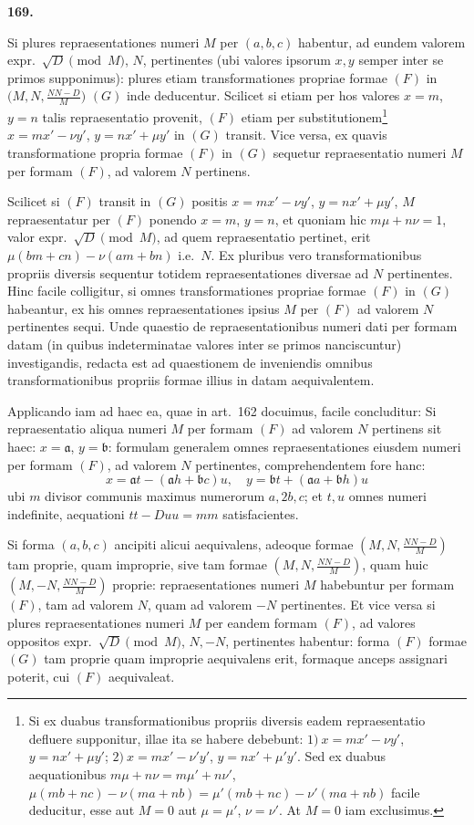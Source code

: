 \documentclass[12pt,a4paper]{article}
\theoremstyle{plain}
\theoremstyle{definition}
\theoremstyle{remark}
\begin{document}
\textbf{169.}

Si plures repraesentationes numeri $M$ per $(a,b,c)$ habentur, ad eundem valorem expr.\ $\sqrt{D}\pmod{M}$, $N$, pertinentes (ubi valores ipsorum $x,y$ semper inter se primos supponimus): plures etiam transformationes propriae formae $(F)$ in $\bigl(M,N,\frac{NN-D}{M}\bigr)$ $(G)$ inde deducentur. Scilicet si etiam per hos valores $x=m$, $y=n$ talis repraesentatio provenit, $(F)$ etiam per substitutionem\footnote{Si ex duabus transformationibus propriis diversis eadem repraesentatio defluere supponitur, illae ita se habere debebunt: $1)\ x=mx'-\nu y'$, $y=nx'+\mu y'$; $2)\ x=mx'-\nu' y'$, $y=nx'+\mu' y'$. Sed ex duabus aequationibus $m\mu+n\nu=m\mu'+n\nu'$, $\mu(mb+nc)-\nu(ma+nb)=\mu'(mb+nc)-\nu'(ma+nb)$ facile deducitur, esse aut $M=0$ aut $\mu=\mu'$, $\nu=\nu'$. At $M=0$ iam exclusimus.}
$x=mx'-\nu y'$, $y=nx'+\mu y'$ in $(G)$ transit. Vice versa, ex quavis transformatione propria formae $(F)$ in $(G)$ sequetur repraesentatio numeri $M$ per formam $(F)$, ad valorem $N$ pertinens.

Scilicet si $(F)$ transit in $(G)$ positis $x=mx'-\nu y'$, $y=nx'+\mu y'$, $M$ repraesentatur per $(F)$ ponendo $x=m$, $y=n$, et quoniam hic $m\mu+n\nu=1$, valor expr.\ $\sqrt{D}\pmod{M}$, ad quem repraesentatio pertinet, erit $\mu(bm+cn)-\nu(am+bn)$ i.e.\ $N$. Ex pluribus vero transformationibus propriis diversis sequentur totidem repraesentationes diversae ad $N$ pertinentes. Hinc facile colligitur, si omnes transformationes propriae formae $(F)$ in $(G)$ habeantur, ex his omnes repraesentationes ipsius $M$ per $(F)$ ad valorem $N$ pertinentes sequi. Unde quaestio de repraesentationibus numeri dati per formam datam (in quibus indeterminatae valores inter se primos nanciscuntur) investigandis, redacta est ad quaestionem de inveniendis omnibus transformationibus propriis formae illius in datam aequivalentem.

Applicando iam ad haec ea, quae in art.\ 162 docuimus, facile concluditur:
Si repraesentatio aliqua numeri $M$ per formam $(F)$ ad valorem $N$ pertinens sit haec: $x=\mathfrak{a}$, $y=\mathfrak{b}$: formulam generalem omnes repraesentationes eiusdem numeri per formam $(F)$, ad valorem $N$ pertinentes, comprehendentem fore hanc:
\[x=\mathfrak{a}t-(\mathfrak{a}h+\mathfrak{b}c)u,\quad y=\mathfrak{b}t+(\mathfrak{a}a+\mathfrak{b}h)u\]
ubi $m$ divisor communis maximus numerorum $a,2b,c$; et $t,u$ omnes numeri indefinite, aequationi $tt-Duu=mm$ satisfacientes.

Si forma $(a,b,c)$ ancipiti alicui aequivalens, adeoque formae $(M,N,\frac{NN-D}{M})$ tam proprie, quam improprie, sive tam formae $(M,N,\frac{NN-D}{M})$, quam huic $(M,-N,\frac{NN-D}{M})$ proprie: repraesentationes numeri $M$ habebuntur per formam $(F)$, tam ad valorem $N$, quam ad valorem $-N$ pertinentes. Et vice versa si plures repraesentationes numeri $M$ per eandem formam $(F)$, ad valores oppositos expr.\ $\sqrt{D}\pmod{M}$, $N,-N$, pertinentes habentur: forma $(F)$ formae $(G)$ tam proprie quam improprie aequivalens erit, formaque anceps assignari poterit, cui $(F)$ aequivaleat.
\end{document}
